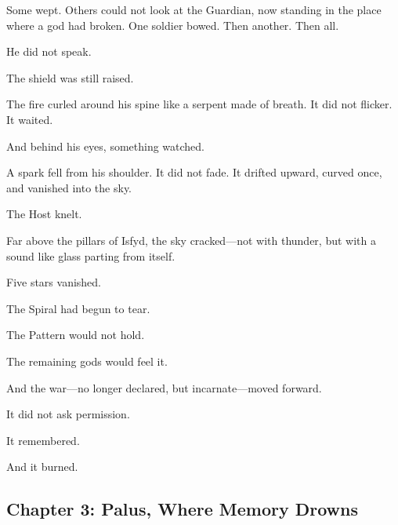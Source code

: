 \documentclass[9pt]{article}
\begin{document}
Some wept. Others could not look at the Guardian, now standing in the place where a god had broken. One soldier bowed. Then another. Then all.

He did not speak.

The shield was still raised.

The fire curled around his spine like a serpent made of breath. It did not flicker. It waited.

And behind his eyes, something watched.

A spark fell from his shoulder. It did not fade. It drifted upward, curved once, and vanished into the sky.

The Host knelt.

Far above the pillars of Isfyd, the sky cracked—not with thunder, but with a sound like glass parting from itself.

Five stars vanished.

The Spiral had begun to tear.

The Pattern would not hold.

The remaining gods would feel it.

And the war—no longer declared, but incarnate—moved forward.

It did not ask permission.

It remembered.

And it burned.

\newpage

\subsection*{Chapter 3: Palus, Where Memory Drowns}

\vspace{1in}
\end{document}
